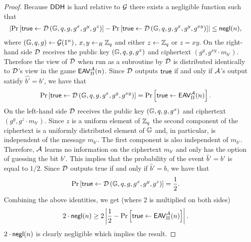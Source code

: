 \begin{proof}
Because $\mathsf{DDH}$ is hard relative to $\operatorname{\mathcal{G}}$ there exists a negligible function such that
\begin{align*}
	\left\vert\operatorname{Pr}\left[{\mathsf{true}\leftarrow \operatorname{\mathcal{D}}\left(\mathbb{G},q,g,g^x,g^y,g^z\right)}\right] - \operatorname{Pr}\left[{\mathsf{true}\leftarrow\operatorname{\mathcal{D}}\left(\mathbb{G},q,g,g^x,g^y,g^{xy}\right)}\right]\right\vert\leq \operatorname{\mathsf{negl}}(n),
\end{align*}
where $(\mathbb{G},q,g)\leftarrow\operatorname{\mathcal{G}}(1^n)$, $x,y\leftarrow_R\mathbb{Z}_q$ and either $z\leftarrow\mathbb{Z}_q$ or $z=xy$. On the right-hand side $\operatorname{\mathcal{D}}$ receives the public key $(\mathbb{G},q,g,g^x)$ and ciphertext $(g^y,g^{xy}\cdot m_{b'})$. Therefore the view of $\operatorname{\mathcal{D}}$ when run as a subroutine by $\operatorname{\mathcal{D}}$ is distributed identically to $\operatorname{\mathcal{D}}$'s view in the game $\mathsf{EAV}_{\operatorname{\Pi}}^{\mathcal{A}}(n)$. Since $\operatorname{\mathcal{D}}$ outputs $\mathsf{true}$ if and only if $\mathcal{A}$'s output satisfy $\hat{b'} = b'$, we have that
\begin{align*}
	\operatorname{Pr}\left[{\mathsf{true}\leftarrow\operatorname{\mathcal{D}}\left(\mathbb{G},q,g,g^x,g^y,g^{xy}\right)}\right] = \operatorname{Pr}\left[{\mathsf{true}\leftarrow\mathsf{EAV}_{\operatorname{\Pi}}^{\mathcal{A}}(n)}\right].
\end{align*}
On the left-hand side $\operatorname{\mathcal{D}}$ receives the public key $(\mathbb{G},q,g,g^x)$ and ciphertext $(g^y,g^z\cdot m_{b'})$. Since $z$ is a uniform element of $\mathbb{Z}_q$ the second component of the ciphertext is a uniformly distributed element of $\mathbb{G}$ and, in particular, is independent of the message $m_{b'}$. The first component is also independent of $m_{b'}$. Therefore, $\mathcal{A}$ learns no information on the ciphertext $m_{b'}$ and only has the option of guessing the bit $b'$. This implies that the probability of the event $\hat{b}' = b'$ is equal to $1/2$. Since $\operatorname{\mathcal{D}}$ outputs true if and only if $\hat{b}' = b$, we have that
\begin{align*}
	\operatorname{Pr}\left[{\mathsf{true}\leftarrow \operatorname{\mathcal{D}}\left(\mathbb{G},q,g,g^x,g^y,g^z\right)}\right] = \frac{1}{2}.
\end{align*} 
Combining the above identities, we get (where 2 is multiplied on both sides)
\begin{align*}
 2\cdot \operatorname{\mathsf{negl}}(n) \geq 2\left\vert \frac{1}{2} - \operatorname{Pr}\left[{\mathsf{true}\leftarrow\mathsf{EAV}_{\operatorname{\Pi}}^{\mathcal{A}}(n)}\right]\right\vert.
\end{align*}
$2\cdot\operatorname{\mathsf{negl}}(n)$ is clearly negligible which implies the result. 
\end{proof}
